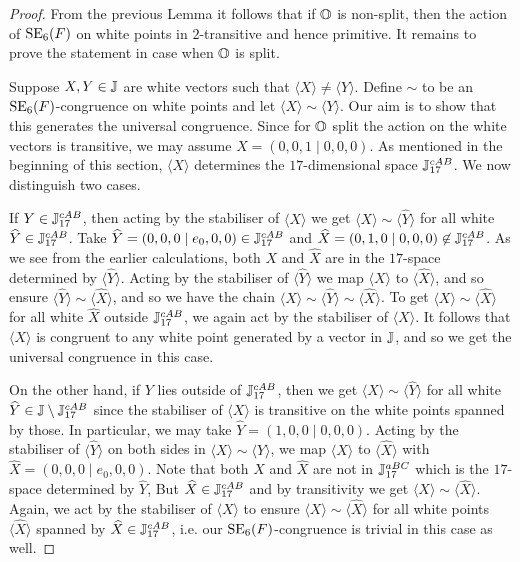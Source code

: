 \begin{proof}
	From the previous Lemma it follows that if $\mathbb{O}$ is non-split, then the action of 
	$\mathrm{SE}_6(F)$ on white points in $2$-transitive and hence primitive. It remains to prove
	the statement in case when $\mathbb{O}$ is split.

	Suppose $X,Y \in \mathbb{J}$ are white vectors such that $\langle X \rangle \neq
	\langle Y \rangle$. Define $\sim$ to be an $\mathrm{SE}_6(F)$-congruence on white points and
	let $\langle X\rangle \sim \langle Y\rangle$. Our aim is to show that this generates 
	the universal congruence. 
	Since for $\mathbb{O}$ split the action on the white vectors is transitive, we may assume
	$X = (0,0,1 \mid 0,0,0)$. As mentioned in the beginning of this section, 
	$\langle X\rangle$ 
	determines the $17$-dimensional space $\mathbb{J}_{17}^{cAB}$. We now distinguish
	two cases.
	
	If $Y \in \mathbb{J}_{17}^{cAB}$, then acting by the stabiliser of $\langle X\rangle$ 
	we get $\langle X\rangle \sim \langle \hat{Y}\rangle $ for all white 
	$\widehat{Y} \in \mathbb{J}_{17}^{cAB}$. Take
	$\widehat{Y} = (0,0,0\mid e_0,0,0) \in \mathbb{J}_{17}^{cAB}$ and 
	\mbox{$\widehat{X} = (0,1,0\mid 0,0,0)
	\not\in \mathbb{J}_{17}^{cAB}$}. As we see from the earlier calculations, both
	$X$ and $\hat{X}$ are in the $17$-space determined by $\langle \hat{Y} \rangle$. 
	Acting by the
	stabiliser of $\langle \hat{Y}\rangle$ 
	we map $\langle X\rangle $ to $\langle \hat{X} \rangle $,
	and so ensure $\langle \hat{Y} \rangle \sim \langle \hat{X} \rangle$,
	and so we have the chain $\langle X\rangle \sim \langle\hat{Y}\rangle \sim 
	\langle\hat{X}\rangle$. To get $\langle X\rangle \sim \langle\hat{X}\rangle$ for 
	all white $\hat{X}$ outside $\mathbb{J}_{17}^{cAB}$, we again act by the stabiliser of $\langle
	X\rangle$.
	It follows that $\langle X \rangle$ is congruent to any white point generated by a 
	vector in $\mathbb{J}$, and so we get the universal congruence in this case.
	
	On the other hand, if $Y$ lies outside of $\mathbb{J}_{17}^{cAB}$, then we get $\langle X
	\rangle\sim \langle\hat{Y}\rangle$
	for all white $\widehat{Y} \in \mathbb{J}\setminus \mathbb{J}_{17}^{cAB}$ since the stabiliser of 
	$\langle X\rangle$ is transitive on the white points spanned by those. 
	In particular, we may take $\hat{Y} = (1,0,0\mid 0,0,0)$.
	Acting by the stabiliser of $\langle\hat{Y}\rangle$ on both sides in 
	$\langle X\rangle \sim \langle\hat{Y}\rangle$, we map 
	$\langle X\rangle$ to $\langle \hat{X}\rangle$ with $\hat{X} = (0,0,0\mid e_0,0,0)$.
	Note that both $X$ and $\hat{X}$ are not 
	in $\mathbb{J}_{17}^{aBC}$ which is the $17$-space determined by $\hat{Y}$, But 
	$\widehat{X} \in \mathbb{J}_{17}^{cAB}$ and by transitivity we get $\langle X\rangle 
	\sim \langle \hat{X} \rangle$. Again,
	we act by the stabiliser of $\langle X\rangle $ to ensure $\langle X\rangle  \sim
	\langle \hat{X} \rangle$ for all white points $\langle \hat{X} \rangle$ spanned by 
	$\widehat{X} \in \mathbb{J}_{17}^{cAB}$, i.e. our $\mathrm{SE}_6(F)$-congruence is trivial in this case 
	as well.
\end{proof}

